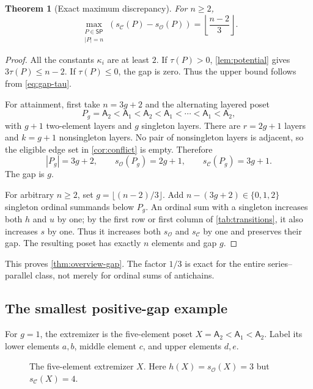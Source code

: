 \documentclass[11pt]{article}
\newtheorem{theorem}{Theorem}[section]
\theoremstyle{definition}
\newcommand{\OO}{\mathcal O}
\newcommand{\CC}{\mathcal C}
\newcommand{\sO}{s_{\OO}}
\newcommand{\sC}{s_{\CC}}
\newcommand{\SP}{\mathsf{SP}}
\newcommand{\A}[1]{\mathsf A_{#1}}
\begin{document}
\begin{theorem}[Exact maximum discrepancy]\label{thm:gap}
For $n\ge2$,
\[
\max_{\substack{P\in\SP\\|P|=n}}(\sC(P)-\sO(P))
=\left\lfloor\frac{n-2}{3}\right\rfloor.
\]
\end{theorem}
\begin{proof}
All the constants $\kappa_i$ are at least $2$. If $\tau(P)>0$, \cref{lem:potential} gives $3\tau(P)\le n-2$. If $\tau(P)\le0$, the gap is zero. Thus the upper bound follows from \eqref{eq:gap-tau}.

For attainment, first take $n=3g+2$ and the alternating layered poset
\begin{equation}\label{eq:extremizer}
P_g=\A2<\A1<\A2<\A1<\cdots<\A1<\A2,
\end{equation}
with $g+1$ two-element layers and $g$ singleton layers. There are $r=2g+1$ layers and $k=g+1$ nonsingleton layers. No pair of nonsingleton layers is adjacent, so the eligible edge set in \cref{cor:conflict} is empty. Therefore
\[
|P_g|=3g+2,\qquad
\sO(P_g)=2g+1,\qquad
\sC(P_g)=3g+1.
\]
The gap is $g$.

For arbitrary $n\ge2$, set $g=\lfloor(n-2)/3\rfloor$. Add $n-(3g+2)\in\{0,1,2\}$ singleton ordinal summands below $P_g$. An ordinal sum with a singleton increases both $h$ and $u$ by one; by the first row or first column of \cref{tab:transitions}, it also increases $s$ by one. Thus it increases both $\sO$ and $\sC$ by one and preserves their gap. The resulting poset has exactly $n$ elements and gap $g$.
\end{proof}

This proves \cref{thm:overview-gap}. The factor $1/3$ is exact for the entire series--parallel class, not merely for ordinal sums of antichains.

\subsection{The smallest positive-gap example}\label{sec:X}
For $g=1$, the extremizer is the five-element poset $X=\A2<\A1<\A2$. Label its lower elements $a,b$, middle element $c$, and upper elements $d,e$.

\begin{figure}[htbp]
\centering
{}
\caption{The five-element extremizer $X$. Here $h(X)=\sO(X)=3$ but $\sC(X)=4$.}\label{fig:X}
\end{figure}
\end{document}
